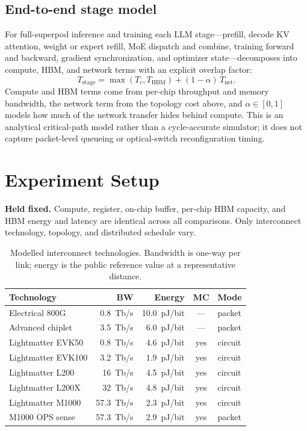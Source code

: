 \documentclass[conference]{IEEEtran}
\newcommand{\pjbit}{pJ/bit}
\newcommand{\tbps}{Tb/s}
\begin{document}
\subsection{End-to-end stage model}
For full-superpod inference and training each LLM
stage---prefill, decode KV attention, weight or expert refill,
MoE dispatch and combine, training forward and backward, gradient
synchronization, and optimizer state---decomposes into compute,
HBM, and network terms with an explicit overlap factor:
\begin{equation}
T_{\text{stage}} = \max(T_c, T_{\text{HBM}})
                 + (1-\alpha)\,T_{\text{net}} .
\end{equation}
Compute and HBM terms come from per-chip throughput and memory
bandwidth, the network term from the topology cost above, and
$\alpha\!\in\![0,1]$ models how much of the network transfer hides
behind compute. This is an analytical critical-path model rather
than a cycle-accurate simulator; it does not capture packet-level
queueing or optical-switch reconfiguration timing.

\section{Experiment Setup}
\label{sec:setup}

\textbf{Held fixed.}
Compute, register, on-chip buffer, per-chip HBM capacity, and
HBM energy and latency are identical across all comparisons.
Only interconnect technology, topology, and distributed schedule
vary.

\begin{table}[t]
\centering
\caption{Modelled interconnect technologies. Bandwidth is one-way
per link; energy is the public reference value at a representative
distance.}
\label{tab:tech}
\scriptsize
\setlength{\tabcolsep}{2.5pt}
\begin{tabular}{lrrcl}
\toprule
Technology         & BW          & Energy        & MC  & Mode \\
\midrule
Electrical 800G    & 0.8~\tbps   & 10.0~\pjbit   & --- & packet \\
Advanced chiplet   & 3.5~\tbps   & 6.0~\pjbit    & --- & packet \\
Lightmatter EVK50  & 0.8~\tbps   & 4.6~\pjbit    & yes & circuit \\
Lightmatter EVK100 & 3.2~\tbps   & 1.9~\pjbit    & yes & circuit \\
Lightmatter L200   & 16~\tbps    & 4.5~\pjbit    & yes & circuit \\
Lightmatter L200X  & 32~\tbps    & 4.8~\pjbit    & yes & circuit \\
Lightmatter M1000  & 57.3~\tbps  & 2.3~\pjbit    & yes & circuit \\
M1000 OPS sense    & 57.3~\tbps  & 2.9~\pjbit    & yes & packet \\
\bottomrule
\end{tabular}
\end{table}
\end{document}
